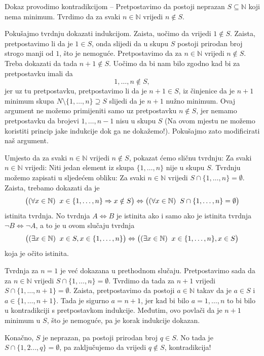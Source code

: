 \documentclass{book}
\let\originalleft\left
\let\originalright\right
\renewcommand{\left}{\mathopen{}\mathclose\bgroup\originalleft}
\renewcommand{\right}{\aftergroup\egroup\originalright}
\renewenvironment{proof}{%
    \vspace{-\parskip}\begin{oldproof}%
    }{%
    \end{oldproof}%
}
\theoremstyle{definition}
\theoremstyle{definition}
\theoremstyle{remark}
\begin{document}
\begin{proof}[Rješenje]
Dokaz provodimo kontradikcijom -- Pretpostavimo da postoji neprazan $S\subseteq \mathbb{N}$ koji nema minimum. Tvrdimo da za svaki $n\in \mathbb{N}$ vrijedi $n\notin S$. 

Pokušajmo tvrdnju dokazati indukcijom. Zaista, uočimo da vrijedi $1\notin S$. Zaista, pretpostavimo li da je $1\in S$, onda slijedi da u skupu $S$ postoji prirodan broj strogo manji od $1$, što je nemoguće. Pretpostavimo da za $n\in \mathbb{N}$ vrijedi $n\notin S$. Treba dokazati da tada $n+1\notin S$. Uočimo da bi nam bilo zgodno kad bi za pretpostavku imali da $$1, \dots, n\notin S,$$ jer uz tu pretpostavku, pretpostavimo li da je $n+1\in S$, iz činjenice da je $n+1$ minimum skupa $N\setminus \{1, \dots, n\}\supseteq S$ slijedi da je $n+1$ nužno minimum. Ovaj argument ne možemo primijeniti samo uz pretpostavku $n\notin S$, jer nemamo pretpostavku da brojevi $1, \dots, n-1$ nisu u skupu $S$ (Na ovom mjestu ne možemo koristiti princip jake indukcije dok ga ne dokažemo!). Pokušajmo zato modificirati naš argument. 

Umjesto da za svaki $n\in \mathbb{N}$ vrijedi $n\notin S$, pokazat ćemo sličnu tvrdnju: Za svaki $n\in \mathbb{N}$ vrijedi: Niti jedan element iz skupa $\{1, \dots, n\}$ nije u skupu $S$. Tvrdnju možemo zapisati u sljedećem obliku: Za svaki $n\in \mathbb{N}$ vrijedi $S\cap \{1, \dots, n\}=\emptyset$. Zaista, trebamo dokazati da je 
$$\left((\forall x\in \mathbb{N})\;\; x\in \{1, \dots, n\}\Rightarrow x\notin S\right)\Leftrightarrow \left((\forall x\in \mathbb{N})\; \; S\cap \{1, \dots, n\}=\emptyset\right)$$
istinita tvrdnja. No tvrdnja $A\Leftrightarrow B$ je istinita ako i samo ako je istinita tvrdnja $\neg B\Leftrightarrow \neg A$, a to je u ovom slučaju tvrdnja
$$\left((\exists x\in \mathbb{N})\; \; x\in S, x\in \{1, \dots, n\}\right)\Leftrightarrow\left((\exists x\in \mathbb{N})\;\; x\in \{1, \dots, n\}, x\in S\right)$$
koja je očito istinita.

Tvrdnja za $n=1$ je već dokazana u prethodnom slučaju. Pretpostavimo sada da za $n\in \mathbb{N}$ vrijedi $S\cap \{1, \dots, n\}=\emptyset$. Tvrdimo da tada za $n+1$ vrijedi $S\cap \{1, \dots, n+1\}=\emptyset$. Zaista, pretpostavimo da postoji $a\in \mathbb{N}$ takav da je $a\in S$ i $a\in \{1, \dots, n+1\}$. Tada je sigurno $a=n+1$, jer kad bi bilo $a=1, \dots, n$ to bi bilo u kontradikciji s pretpostavkom indukcije. Međutim, ovo povlači da je $n+1$ minimum u $S$, što je nemoguće, pa je korak indukcije dokazan.

Konačno, $S$ je neprazan, pa postoji prirodan broj $q\in S$. No tada je $S\cap \{1, 2\dots, q\}=\emptyset$, pa zaključujemo da vrijedi $q\notin S$, kontradikcija!
\end{proof}
\end{document}
